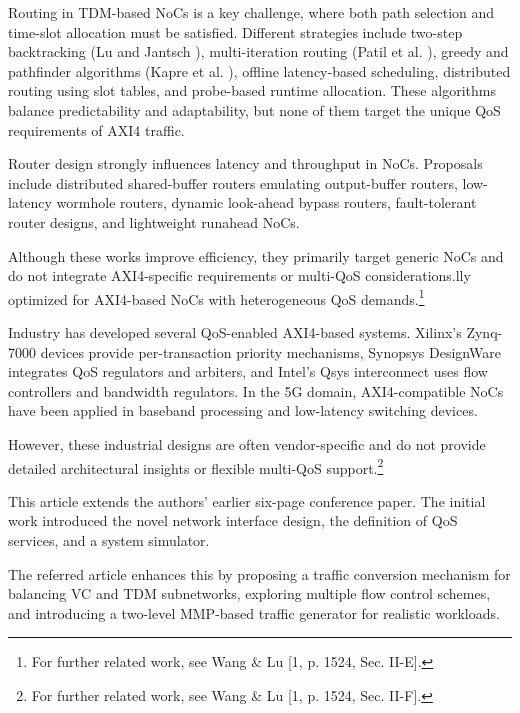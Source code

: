 Routing in TDM-based NoCs is a key challenge, where both path selection and time-slot allocation must be satisfied. Different strategies include two-step backtracking (Lu and Jantsch \cite{lu_tdm_2008}), multi-iteration routing (Patil et al. \cite{patil_bandwidth-optimized_2018}), greedy and pathfinder algorithms (Kapre et al. \cite{kapre_packet_2006}), offline latency-based scheduling, distributed routing using slot tables, and probe-based runtime allocation. These algorithms balance predictability and adaptability, but none of them target the unique QoS requirements of AXI4 traffic. 


Router design strongly influences latency and throughput in NoCs. Proposals include distributed shared-buffer routers emulating output-buffer routers, low-latency wormhole routers, dynamic look-ahead bypass routers, fault-tolerant router designs, and lightweight runahead NoCs.

Although these works improve efficiency, they primarily target generic NoCs and do not integrate AXI4-specific requirements or multi-QoS considerations.lly optimized for AXI4-based NoCs with heterogeneous QoS demands.\footnote{For further related work, see Wang \& Lu [1, p. 1524, Sec. II-E].} 


Industry has developed several QoS-enabled AXI4-based systems. Xilinx’s Zynq-7000 devices provide per-transaction priority mechanisms, Synopsys DesignWare integrates QoS regulators and arbiters, and Intel’s Qsys interconnect uses flow controllers and bandwidth regulators. In the 5G domain, AXI4-compatible NoCs have been applied in baseband processing and low-latency switching devices.

However, these industrial designs are often vendor-specific and do not provide detailed architectural insights or flexible multi-QoS support.\footnote{For further related work, see Wang \& Lu [1, p. 1524, Sec. II-F].}


This article extends the authors’ earlier six-page conference paper. The initial work introduced the novel network interface design, the definition of QoS services, and a system simulator.

The referred article enhances this by proposing a traffic conversion mechanism for balancing \ac{VC} and \ac{TDM} subnetworks, exploring multiple flow control schemes, and introducing a two-level \ac{MMP}-based traffic generator for realistic workloads.

